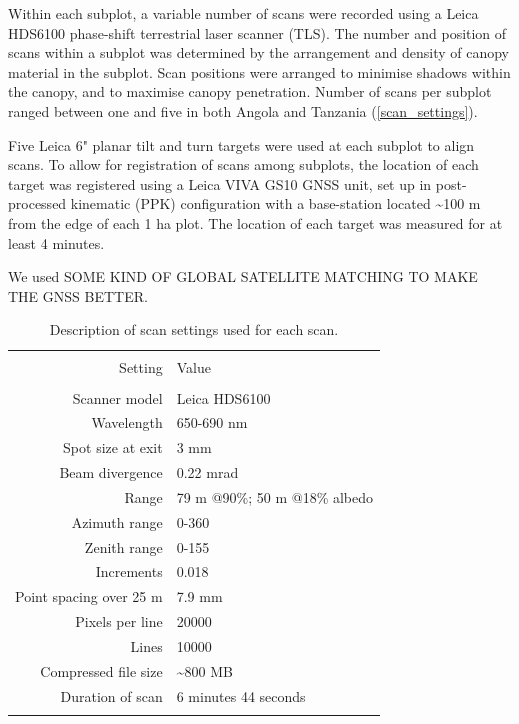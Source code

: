 \documentclass[11pt,a4paper]{article}
\begin{document}
Within each subplot, a variable number of scans were recorded using a Leica HDS6100 phase-shift terrestrial laser scanner (TLS). The number and position of scans within a subplot was determined by the arrangement and density of canopy material in the subplot. Scan positions were arranged to minimise shadows within the canopy, and to maximise canopy penetration. Number of scans per subplot ranged between one and five in both Angola and Tanzania (\autoref{scan_settings}).

Five Leica 6" planar tilt and turn targets were used at each subplot to align scans. To allow for registration of scans among subplots, the location of each target was registered using a Leica VIVA GS10 GNSS unit, set up in post-processed kinematic (PPK) configuration with a base-station located \textasciitilde{}100 m from the edge of each 1 ha plot. The location of each target was measured for at least 4 minutes. 

We used SOME KIND OF GLOBAL SATELLITE MATCHING TO MAKE THE GNSS BETTER.

\begin{table}[H] \centering 
  \caption{Description of scan settings used for each scan.} 
  \label{scan_settings} 
\begin{tabular}{@{\extracolsep{0pt}} rl} 
\\[-1.8ex]\hline 
\hline \\[-1.8ex] 
{Setting} & {Value} \\
\hline \\[-1.8ex] 
Scanner model & Leica HDS6100 \\
Wavelength & 650-690 nm \\
Spot size at exit & 3 mm \\
Beam divergence & 0.22 mrad \\
Range & 79 m @90\%; 50 m @18\% albedo \\
Azimuth range & 0-360\textdegree{} \\
Zenith range & 0-155\textdegree{} \\
Increments & 0.018\textdegree{} \\
Point spacing over 25 m & 7.9 mm \\
Pixels per line & 20000 \\
Lines & 10000 \\
Compressed file size & \textasciitilde{}800 MB \\
Duration of scan & 6 minutes 44 seconds \\
\hline
\hline \\[-1.8ex] 
\end{tabular} 
\end{table} 
\end{document}
